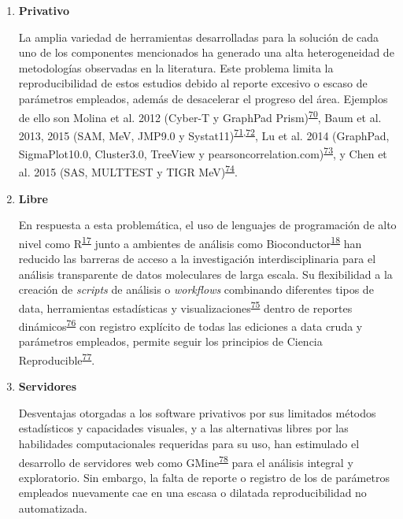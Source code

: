 \documentclass[]{article}
\begin{document}
\begin{enumerate}
\begin{enumerate}
    \begin{enumerate}
    \def\labelenumiii{\arabic{enumiii}.}
    \item
      \textbf{Privativo}

      La amplia variedad de herramientas desarrolladas para la solución
      de cada uno de los componentes mencionados ha generado una alta
      heterogeneidad de metodologías observadas en la literatura. Este
      problema limita la reproducibilidad de estos estudios debido al
      reporte excesivo o escaso de parámetros empleados, además de
      desacelerar el progreso del área. Ejemplos de ello son Molina et
      al. 2012 (Cyber-T y GraphPad
      Prism)\textsuperscript{\protect\hyperlink{ref-molina2012}{70}},
      Baum et al. 2013, 2015 (SAM, MeV, JMP9.0 y
      Systat11)\textsuperscript{\protect\hyperlink{ref-baum2013}{71},\protect\hyperlink{ref-baum2015}{72}},
      Lu et al. 2014 (GraphPad, SigmaPlot10.0, Cluster3.0, TreeView y
      pearsoncorrelation.com)\textsuperscript{\protect\hyperlink{ref-lu2014rama}{73}},
      y Chen et al. 2015 (SAS, MULTTEST y TIGR
      MeV)\textsuperscript{\protect\hyperlink{ref-chen2015immunomics}{74}}.
    \item
      \textbf{Libre}

      En respuesta a esta problemática, el uso de lenguajes de
      programación de alto nivel como
      R\textsuperscript{\protect\hyperlink{ref-R2016}{17}} junto a
      ambientes de análisis como
      Bioconductor\textsuperscript{\protect\hyperlink{ref-bioconductor2004}{18}}
      han reducido las barreras de acceso a la investigación
      interdisciplinaria para el análisis transparente de datos
      moleculares de larga escala. Su flexibilidad a la creación de
      \emph{scripts} de análisis o \emph{workflows} combinando
      diferentes tipos de data, herramientas estadísticas y
      visualizaciones\textsuperscript{\protect\hyperlink{ref-Biobase}{75}}
      dentro de reportes
      dinámicos\textsuperscript{\protect\hyperlink{ref-knitr}{76}} con
      registro explícito de todas las ediciones a data cruda y
      parámetros empleados, permite seguir los principios de Ciencia
      Reproducible\textsuperscript{\protect\hyperlink{ref-CienciaReproducible2016}{77}}.
      \newpage
    \item
      \textbf{Servidores}

      Desventajas otorgadas a los software privativos por sus limitados
      métodos estadísticos y capacidades visuales, y a las alternativas
      libres por las habilidades computacionales requeridas para su uso,
      han estimulado el desarrollo de servidores web como
      GMine\textsuperscript{\protect\hyperlink{ref-gmine2016}{78}} para
      el análisis integral y exploratorio. Sin embargo, la falta de
      reporte o registro de los de parámetros empleados nuevamente cae
      en una escasa o dilatada reproducibilidad no automatizada.
    \end{enumerate}
  \end{enumerate}
\end{enumerate}
\end{document}
